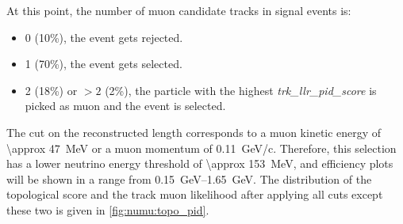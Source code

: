 At this point, the number of muon candidate tracks in signal events is:

\begin{itemize}
    \item 0 (10\%), the event gets rejected.
    \item 1 (70\%), the event gets selected.
    \item 2 (18\%) or $>2$ (2\%), the particle with the highest \textit{trk\_llr\_pid\_score} is picked as muon and the event is selected.
\end{itemize}

The cut on the reconstructed length corresponds to a muon kinetic energy of \SI{\approx 47}{\MeV} or a muon momentum of \SI{0.11}{GeV/c}. Therefore, this selection has a lower neutrino energy threshold of \SI{\approx 153}{\MeV}, and efficiency plots will be shown in a range from \SIrange{0.15}{1.65}{\GeV}.
The distribution of the topological score and the track muon likelihood after applying all cuts except these two is given in \cref{fig:numu:topo_pid}.


